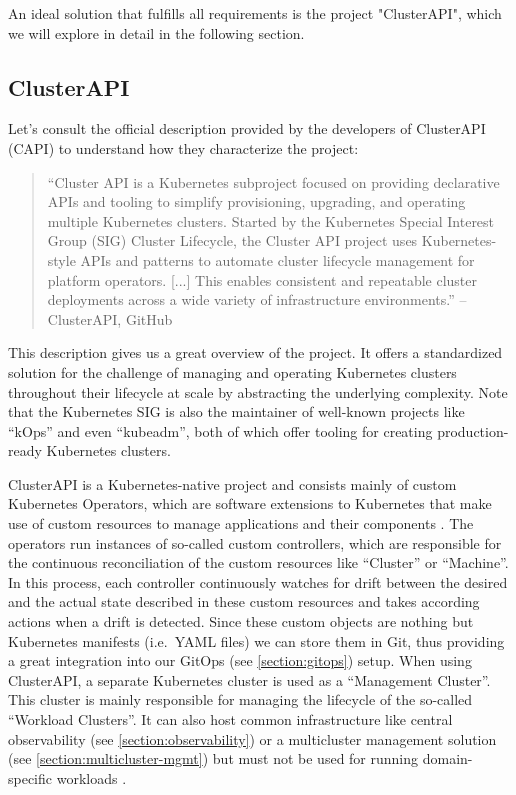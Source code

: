     An ideal solution that fulfills all requirements is the project "ClusterAPI", which we will explore in detail in the following section.
    

    \subsection{ClusterAPI}
    \label{subsection:capi}

    Let's consult the official description provided by the developers of ClusterAPI (CAPI) to understand how they characterize the project:

    \begin{quote}
        ``Cluster API is a Kubernetes subproject focused on providing declarative APIs and tooling to simplify provisioning, upgrading, and operating multiple Kubernetes clusters. Started by the Kubernetes Special Interest Group (SIG) Cluster Lifecycle, the Cluster API project uses Kubernetes-style APIs and patterns to automate cluster lifecycle management for platform operators. [...] This enables consistent and repeatable cluster deployments across a wide variety of infrastructure environments.'' -- ClusterAPI, GitHub \cite{capi_github}
    \end{quote}

    \noindent This description gives us a great overview of the project. It offers a standardized solution for the challenge of managing and operating Kubernetes clusters throughout their lifecycle at scale by abstracting the underlying complexity. Note that the Kubernetes SIG is also the maintainer of well-known projects like ``kOps'' and even ``kubeadm'', both of which offer tooling for creating production-ready Kubernetes clusters. \newline

    ClusterAPI is a Kubernetes-native project and consists mainly of custom Kubernetes Operators, which are software extensions to Kubernetes that make use of custom resources to manage applications and their components \cite{k8s_operator_pattern}. The operators run instances of so-called custom controllers, which are responsible for the continuous reconciliation of the custom resources like ``Cluster'' or ``Machine''. In this process, each controller continuously watches for drift between the desired and the actual state described in these custom resources and takes according actions when a drift is detected. Since these custom objects are nothing but Kubernetes manifests (i.e.\ YAML files) we can store them in Git, thus providing a great integration into our GitOps (see \autoref{section:gitops}) setup. When using ClusterAPI, a separate Kubernetes cluster is used as a ``Management Cluster''. This cluster is mainly responsible for managing the lifecycle of the so-called ``Workload Clusters''. It can also host common infrastructure like central observability (see \autoref{section:observability}) or a multicluster management solution (see \autoref{section:multicluster-mgmt}) but must not be used for running domain-specific workloads \cite{efficient_k8s_capi}.\newline

